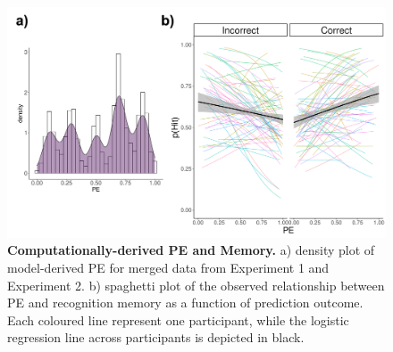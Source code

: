 \documentclass[a4paper,12pt]{article}
\begin{document}
\begin{figure}[ht!]
\centerline
{\includegraphics[width=1\textwidth]{figures/comp_derivedPE_memory.png}} 
\caption{\textbf{Computationally-derived PE and Memory.} a)   density plot of model-derived PE for merged data from Experiment 1 and Experiment 2. b) spaghetti plot of the observed relationship between PE and recognition memory as a function of prediction outcome. Each coloured line represent one participant, while the logistic regression line across participants is depicted in black. %
}
\label{fig:PE_mem}
\end{figure}
\end{document}
